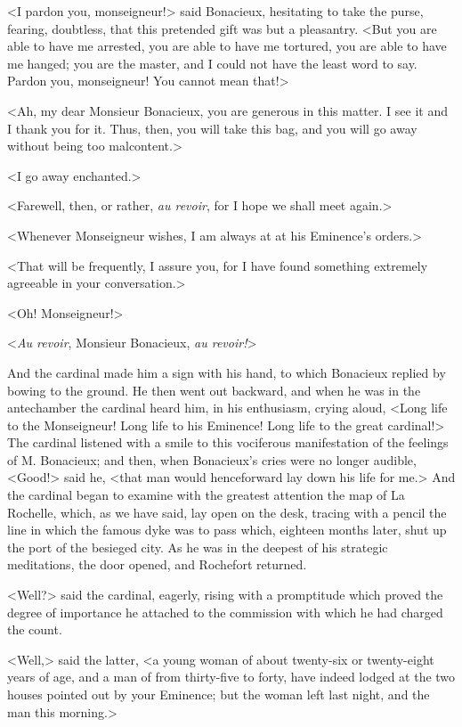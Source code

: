 <I pardon you, monseigneur!> said Bonacieux, hesitating to take the purse, fearing, doubtless, that this pretended gift was but a pleasantry. <But you are able to have me arrested, you are able to have me tortured, you are able to have me hanged; you are the master, and I could not have the least word to say. Pardon you, monseigneur! You cannot mean that!> 

<Ah, my dear Monsieur Bonacieux, you are generous in this matter. I see it and I thank you for it. Thus, then, you will take this bag, and you will go away without being too malcontent.> 

<I go away enchanted.> 

<Farewell, then, or rather, \textit{au revoir}, for I hope we shall meet again.> 

<Whenever Monseigneur wishes, I am always at at his Eminence's orders.> 

<That will be frequently, I assure you, for I have found something extremely agreeable in your conversation.> 

<Oh! Monseigneur!> 

<\textit{Au revoir}, Monsieur Bonacieux, \textit{au revoir!}> 

And the cardinal made him a sign with his hand, to which Bonacieux replied by bowing to the ground. He then went out backward, and when he was in the antechamber the cardinal heard him, in his enthusiasm, crying aloud, <Long life to the Monseigneur! Long life to his Eminence! Long life to the great cardinal!> The cardinal listened with a smile to this vociferous manifestation of the feelings of M. Bonacieux; and then, when Bonacieux's cries were no longer audible, <Good!> said he, <that man would henceforward lay down his life for me.> And the cardinal began to examine with the greatest attention the map of La Rochelle, which, as we have said, lay open on the desk, tracing with a pencil the line in which the famous dyke was to pass which, eighteen months later, shut up the port of the besieged city. As he was in the deepest of his strategic meditations, the door opened, and Rochefort returned. 

<Well?> said the cardinal, eagerly, rising with a promptitude which proved the degree of importance he attached to the commission with which he had charged the count. 

<Well,> said the latter, <a young woman of about twenty-six or twenty-eight years of age, and a man of from thirty-five to forty, have indeed lodged at the two houses pointed out by your Eminence; but the woman left last night, and the man this morning.> 

